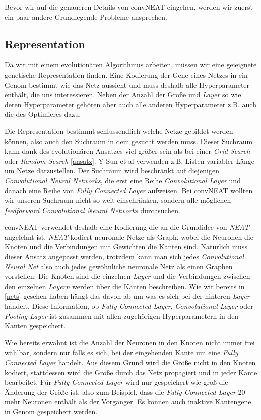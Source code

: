 \documentclass[]{scrartcl}
\begin{document}
		Bevor wir auf die genaueren Details von convNEAT eingehen, werden wir zuerst ein paar andere Grundlegende Probleme ansprechen.

		\subsection{Representation}

			Da wir mit einem evolutionären Algorithmus arbeiten, müssen wir eine geieignete genetische Representation finden.
			Eine Kodierung der Gene eines Netzes in ein Genom bestimmt wie das Netz aussieht und muss deshalb alle Hyperparameter enthält, die uns interessieren.
			Neben der Anzahl der Größe und \textit{Layer} so wie deren Hyperparameter gehören aber auch alle anderen Hyperparameter z.B. auch
			die des Optimieres dazu.

			Die Representation bestimmt schlussendlich welche Netze gebildet werden können, also auch den Suchraum in dem gesucht werden muss.
			Dieser Suchraum kann dank des evolutionären Ansatzes viel größer sein als bei einer \textit{Grid Search} oder \textit{Random Search} \ref{ansatz}.
			Y Sun et al \cite{convoneat} verwenden z.B. Listen variabler Länge um Netze darzustellen.
			Der Suchraum wird beschränkt auf diejenigen \textit{Convolutional Neural Networks}, die erst eine Reihe \textit{Convolutional Layer}
			und danach eine Reihe von \textit{Fully Connected Layer} aufweisen.
			Bei convNEAT wollten wir unseren Suchraum nicht so weit einschränken, sondern alle möglichen \textit{feedforward Convolutional Neural Networks} durchsuchen.

			convNEAT verwendet deshalb eine Kodierung die an die Grundidee von \textit{NEAT} angelehnt ist.
			\textit{NEAT} kodiert neuronale Netze als Graph, wobei die Neuronen die Knoten und die Verbindungen mit Gewichten die Kanten sind.
			Natürlich muss dieser Ansatz angepasst werden, trotzdem kann man sich jedes \textit{Convolutional Neural Net}
			also auch jedes gewöhnliche neuronale Netz als einen Graphen vorstellen:
			Die Knoten sind die einzelnen \textit{Layer} und die Verbindungen zwischen den einzelnen \textit{Layern} werden über die Kanten beschreiben.
			Wie wir bereits in \ref{nets} gesehen haben hängt das davon ab um was es sich bei der hinteren \textit{Layer} handelt.
			Diese Information, ob \textit{Fully Connected Layer}, \textit{Convolutional Layer} oder \textit{Pooling Layer} ist zusammen mit allen
			zugehörigen Hyperparametern in den Kanten gespeichert.

			Wie bereits erwähnt ist die Anzahl der Neuronen in den Knoten nicht immer frei wählbar, sondern nur falls es sich, bei der eingehenden Kante
			um eine \textit{Fully Connected Layer} handelt. Aus diesem Grund wird die Größe nicht in den Knoten kodiert,
			stattdessen wird die Größe durch das Netz propagiert und in jeder Kante bearbeitet. Für \textit{Fully Connected Layer} wird nur gespeichert
			wie groß die Änderung der Größe ist, also zum Beispiel, dass die \textit{Fully Connected Layer} 20 mehr Neuronen enthält als der Vorgänger.
			Es können auch inaktive Kantengene in Genom gespeichert werden.
\end{document}
